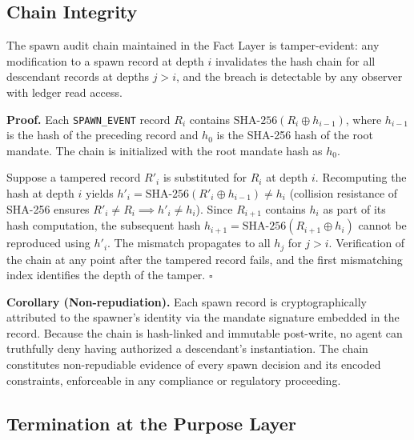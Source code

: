 \subsection{Chain Integrity}
\label{sec:chain-integrity}

\begin{theorem}
The spawn audit chain maintained in the Fact Layer is tamper-evident: any modification to a spawn record at depth $i$ invalidates the hash chain for all descendant records at depths $j > i$, and the breach is detectable by any observer with ledger read access.
\end{theorem}

\medskip\noindent
\textbf{Proof.} Each \texttt{SPAWN\_EVENT} record $R_i$ contains $\text{SHA-256}(R_i \oplus h_{i-1})$, where $h_{i-1}$ is the hash of the preceding record and $h_0$ is the SHA-256 hash of the root mandate. The chain is initialized with the root mandate hash as $h_0$.

Suppose a tampered record $R'_i$ is substituted for $R_i$ at depth $i$. Recomputing the hash at depth $i$ yields $h'_i = \text{SHA-256}(R'_i \oplus h_{i-1}) \neq h_i$ (collision resistance of SHA-256 ensures $R'_i \neq R_i \implies h'_i \neq h_i$). Since $R_{i+1}$ contains $h_i$ as part of its hash computation, the subsequent hash $h_{i+1} = \text{SHA-256}(R_{i+1} \oplus h_i)$ cannot be reproduced using $h'_i$. The mismatch propagates to all $h_j$ for $j > i$. Verification of the chain at any point after the tampered record fails, and the first mismatching index identifies the depth of the tamper. $\square$

\medskip\noindent
\textbf{Corollary (Non-repudiation).} Each spawn record is cryptographically attributed to the spawner's identity via the mandate signature embedded in the record. Because the chain is hash-linked and immutable post-write, no agent can truthfully deny having authorized a descendant's instantiation. The chain constitutes non-repudiable evidence of every spawn decision and its encoded constraints, enforceable in any compliance or regulatory proceeding.

\subsection{Termination at the Purpose Layer}
\label{sec:termination}

